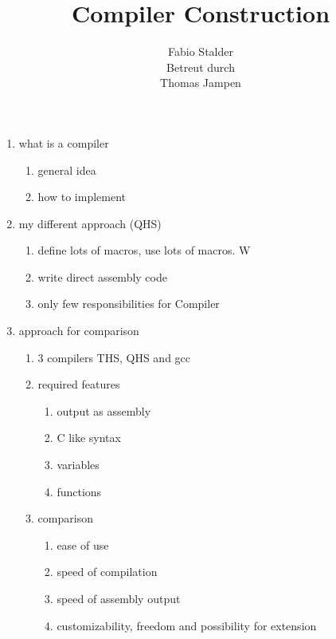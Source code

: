 \documentclass[parskip=full]{scrreprt}
\title{Compiler Construction}
\author{Fabio Stalder\vspace{1cm}\\
Betreut durch \\
Thomas Jampen}
\begin{document}
\maketitle

\tableofcontents


\iffalse
    \begin{enumerate}
        \item what is a compiler
              \begin{enumerate}
                  \item general idea
                  \item how to implement
              \end{enumerate}
        \item my different approach (QHS)
              \begin{enumerate}
                  \item define lots of macros, use lots of macros. W
                  \item write direct assembly code
                  \item only few responsibilities for Compiler
              \end{enumerate}
        \item approach for comparison
              \begin{enumerate}
                  \item 3 compilers THS, QHS and gcc
                  \item required features
                        \begin{enumerate}
                            \item output as assembly
                            \item C like syntax
                            \item variables
                            \item functions
                        \end{enumerate}
                  \item comparison
                        \begin{enumerate}
                            \item ease of use
                            \item speed of compilation
                            \item speed of assembly output
                            \item customizability, freedom and possibility for extension

\end{enumerate}
\end{enumerate}
\end{enumerate}
\end{document}
